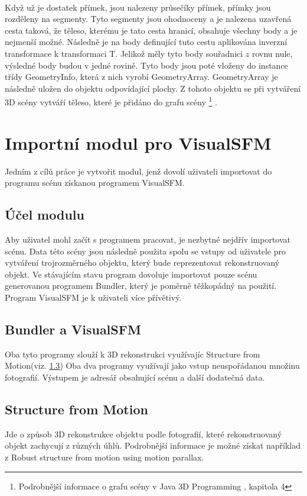 \documentclass[11pt,twoside,a4paper]{book}
\begin{document}
\paragraph{}
Když už je dostatek přímek, jsou nalezeny průsečíky přímek, přímky jsou rozděleny na segmenty. Tyto segmenty jsou ohodnoceny a je nalezena uzavřená cesta taková, že těleso, kterému je tato cesta hranicí, obsahuje všechny body a je nejmenší možné. Následně je na body definující tuto cestu aplikována inverzní transformace k transformaci T. Jelikož měly tyto body souřadnici $z$ rovnu nule, výsledné body budou v jedné rovině. Tyto body jsou poté vloženy do instance třídy GeometryInfo, která z nich vyrobí GeometryArray. GeometryArray je následně uložen do objektu odpovídající plochy. Z tohoto objektu se při vytváření 3D scény vytváří těleso, které je přidáno do grafu scény \footnote{Podrobnější informace o grafu scény v Java 3D Programming \cite{Java3DGuide}, kapitola 4} . 

\section{Importní modul pro VisualSFM}
\label{analyzaStart}
Jedním z cílů práce je vytvořit modul, jenž dovolí uživateli importovat do programu scénu získanou programem VisualSFM. 

\subsection{Účel modulu}
Aby uživatel mohl začít s programem pracovat, je nezbytné nejdřív importovat scénu. Data této scény jsou následně použita spolu se vstupy od uživatele pro vytváření trojrozměrného objektu, který bude reprezentovat rekonstruovaný objekt. Ve stávajícím stavu program dovoluje importovat pouze scénu generovanou programem Bundler, který je poměrně těžkopádný na použití. Program VisualSFM je k uživateli více přívětivý.

\subsection{Bundler a VisualSFM}
Oba tyto programy slouží k 3D rekonstrukci využívajíc Structure from Motion(viz. \ref{SFM}) Oba dva programy využívají jako vstup neuspořádanou množinu fotografií. Výstupem je adresář obsahující scénu a další dodatečná data.

\subsection{Structure from Motion}
\label{SFM}
Jde o způsob 3D rekonstrukce objektu podle fotografií, které rekonstruovaný objekt zachycují z různých úhlů. Podrobnější informace je možné získat například z Robust structure from motion using motion parallax\cite{Cipo}.
\end{document}
